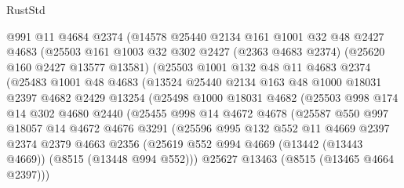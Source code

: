 \begin{lexlean}{RustStd}
\begin{coremodule}
            @991
            @11
            @4684
            @2374
            (@14578
              @25440
              @2134
              @161
              @1001
              @32
              @48
              @2427
              @4683
              (@25503
                @161
                @1003
                @32
                @302
                @2427
                (@2363 @4683 @2374)
                (@25620 @160 @2427 @13577 @13581)
                (@25503
                  @1001
                  @132
                  @48
                  @11
                  @4683
                  @2374
                  (@25483
                    @1001
                    @48
                    @4683
                    (@13524
                      @25440
                      @2134
                      @163
                      @48
                      @1000
                      @18031
                      @2397
                      @4682
                      @2429
                      @13254
                      (@25498
                        @1000
                        @18031
                        @4682
                        (@25503
                          @998
                          @174
                          @14
                          @302
                          @4680
                          @2440
                          (@25455
                            @998
                            @14
                            @4672
                            @4678
                            (@25587
                              @550
                              @997
                              @18057
                              @14
                              @4672
                              @4676
                              @3291
                              (@25596
                                @995
                                @132
                                @552
                                @11
                                @4669
                                @2397
                                @2374
                                @2379
                                @4663
                                @2356
                                (@25619
                                  @552
                                  @994
                                  @4669
                                  (@13442 (@13443 @4669))
                                  (@8515 (@13448 @994 @552)))
                                @25627
                                @13463
                                (@8515 (@13465 @4664 @2397)))

\end{coremodule}
\end{lexlean}

